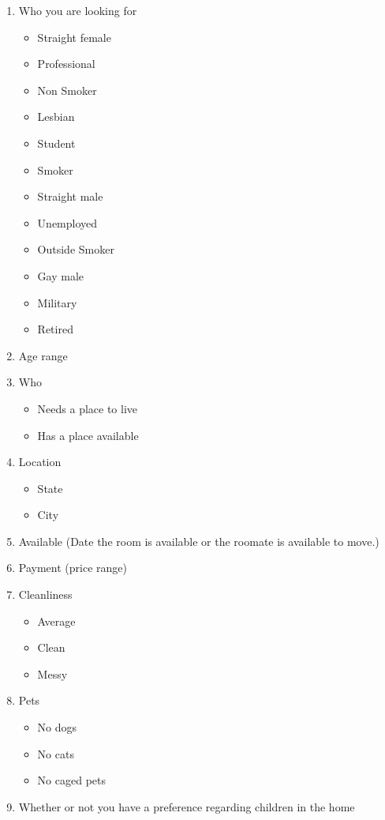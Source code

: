 \documentclass[journal]{./IEEE/IEEEtran}
\begin{document}
\begin{enumerate}
    \item Who you are looking for
    \begin{itemize}
        \item Straight female
        \item Professional
        \item Non Smoker
        \item Lesbian
        \item Student
        \item Smoker
        \item Straight male
        \item Unemployed
        \item Outside Smoker
        \item Gay male
        \item Military
        \item Retired
    \end{itemize}
    \item Age range
    \item Who
    \begin{itemize}
        \item Needs a place to live
        \item Has a place available
    \end{itemize}
    \item Location
    \begin{itemize}
        \item State
        \item City
    \end{itemize}
    \item Available (Date the room is available or the roomate is available to move.)
    \item Payment (price range)
    \item Cleanliness
    \begin{itemize}
        \item Average
        \item Clean
        \item Messy
    \end{itemize}
    \item Pets
    \begin{itemize}
        \item No dogs
        \item No cats
        \item No caged pets
    \end{itemize}
    \item Whether or not you have a preference regarding children in the home
\end{enumerate}
\end{document}
